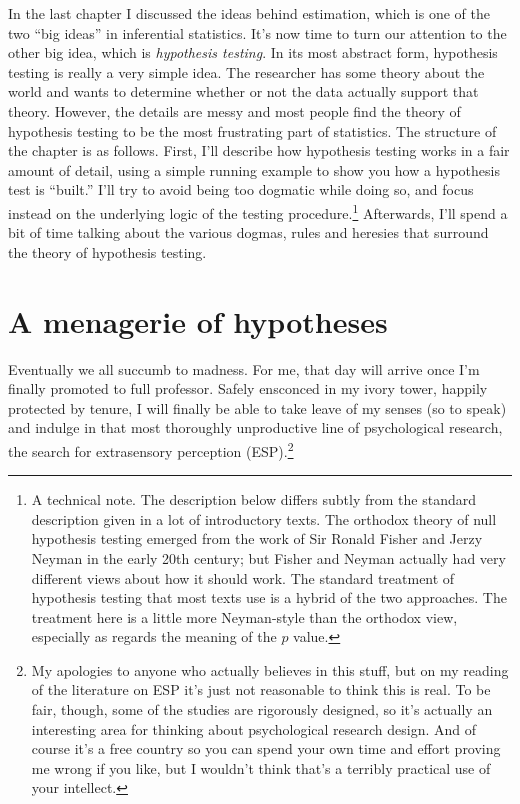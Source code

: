 \documentclass[
]{book}
\begin{document}
In the last chapter I discussed the ideas behind estimation, which is one of the two ``big ideas'' in inferential statistics. It's now time to turn our attention to the other big idea, which is \emph{hypothesis testing}. In its most abstract form, hypothesis testing is really a very simple idea. The researcher has some theory about the world and wants to determine whether or not the data actually support that theory. However, the details are messy and most people find the theory of hypothesis testing to be the most frustrating part of statistics. The structure of the chapter is as follows. First, I'll describe how hypothesis testing works in a fair amount of detail, using a simple running example to show you how a hypothesis test is ``built.'' I'll try to avoid being too dogmatic while doing so, and focus instead on the underlying logic of the testing procedure.\footnote{A technical note. The description below differs subtly from the standard description given in a lot of introductory texts. The orthodox theory of null hypothesis testing emerged from the work of Sir Ronald Fisher and Jerzy Neyman in the early 20th century; but Fisher and Neyman actually had very different views about how it should work. The standard treatment of hypothesis testing that most texts use is a hybrid of the two approaches. The treatment here is a little more Neyman-style than the orthodox view, especially as regards the meaning of the \(p\) value.} Afterwards, I'll spend a bit of time talking about the various dogmas, rules and heresies that surround the theory of hypothesis testing.

\hypertarget{hypotheses}{%
\section{A menagerie of hypotheses}\label{hypotheses}}

Eventually we all succumb to madness. For me, that day will arrive once I'm finally promoted to full professor. Safely ensconced in my ivory tower, happily protected by tenure, I will finally be able to take leave of my senses (so to speak) and indulge in that most thoroughly unproductive line of psychological research, the search for extrasensory perception (ESP).\footnote{My apologies to anyone who actually believes in this stuff, but on my reading of the literature on ESP it's just not reasonable to think this is real. To be fair, though, some of the studies are rigorously designed, so it's actually an interesting area for thinking about psychological research design. And of course it's a free country so you can spend your own time and effort proving me wrong if you like, but I wouldn't think that's a terribly practical use of your intellect.}
\end{document}
